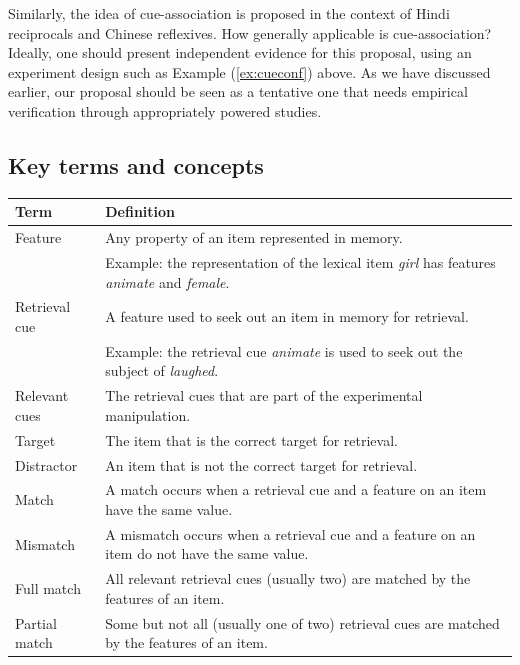 \documentclass{cambridge7A}\usepackage[]{graphicx}\usepackage[]{color}
\begin{document}
Similarly, the idea of cue-association is proposed in the context of Hindi reciprocals and Chinese reflexives. How generally applicable is cue-association? Ideally, one should present independent evidence for this proposal, using an experiment design such as Example (\ref{ex:cueconf}) above. As we have discussed earlier, our proposal should be seen as a tentative one that needs empirical verification through appropriately powered studies.

\newpage

\begin{subappendices}
\section{Key terms and concepts}

\begin{table}[!htbp]
\begin{center}
{\footnotesize
\begin{tabular}{p{4cm}p{6cm}}
\hline
Term                & Definition \\
\hline
Feature             & Any property of an item represented in memory. \\
                    & Example: the representation of the lexical item \textit{girl} has features \emph{animate} and \emph{female}. \\
Retrieval cue       & A feature used to seek out an item in memory for retrieval. \\
                    & Example: the retrieval cue \textit{animate} is used to seek out the subject of \textit{laughed}. \\
Relevant cues				& The retrieval cues that are part of the experimental manipulation. \\
Target              & The item that is the correct target for retrieval. \\
Distractor          & An item that is not the correct target for retrieval. \\
Match               & A match occurs when a retrieval cue and a feature on an item have the same value. \\
Mismatch            & A mismatch occurs when a retrieval cue and a feature on an item do not have the same value. \\
Full match 			    & All relevant retrieval cues (usually two) are matched by the features of an item. \\
Partial match 			& Some but not all (usually one of two) retrieval cues are matched by the features of an item. \\

\end{tabular}}
\end{center}
\end{table}
\end{subappendices}
\end{document}
